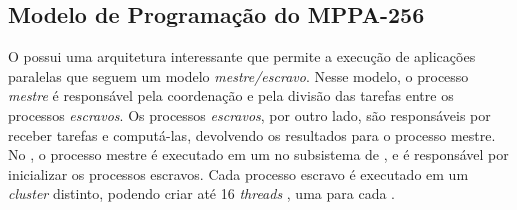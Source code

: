 
\subsection{Modelo de Programação do MPPA-256}
\label{sec:prog-mppa}
%
%
%

O \mppa possui uma arquitetura interessante que permite a execução de aplicações paralelas
que seguem um modelo \textit{mestre/escravo}. Nesse modelo, o processo \textit{mestre} é responsável
pela coordenação e pela divisão das tarefas entre os processos \textit{escravos}. Os processos \textit{escravos},
por outro lado, são responsáveis por receber tarefas e computá-las, devolvendo os resultados para o processo
mestre. No \mppa, o processo mestre é executado em um \rman no subsistema de
\es, e é responsável por inicializar os processos escravos. Cada processo escravo
é executado em um \textit{cluster} distinto, podendo criar até 16 \textit{threads} \posix, uma para cada \pe.

